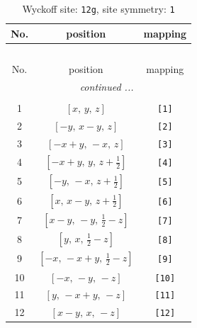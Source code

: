\documentclass[fleqn,8pt]{jsarticle}
\begin{document}
\renewcommand{\arraystretch}{1.2}
\begin{longtable}{ccc}
\caption{Wyckoff site: {\tt 12g}, site symmetry: {\tt 1}}
 \\
 \hline \hline
No. & position & mapping \\ \hline \endfirsthead

\multicolumn{2}{l}{\tablename\ \thetable{}} \\
 \hline \hline
No. & position & mapping \\ \hline \endhead

 \hline \hline
\multicolumn{2}{r}{\footnotesize\it continued ...} \\ \endfoot

 \hline \hline
\multicolumn{2}{r}{} \\ \endlastfoot

1 & $\left[ x,\, y,\, z \right]$ & {\tt [1]} \\ \hline
2 & $\left[ - y,\, x - y,\, z \right]$ & {\tt [2]} \\ \hline
3 & $\left[ - x + y,\, - x,\, z \right]$ & {\tt [3]} \\ \hline
4 & $\left[ - x + y,\, y,\, z + \frac{1}{2} \right]$ & {\tt [4]} \\ \hline
5 & $\left[ - y,\, - x,\, z + \frac{1}{2} \right]$ & {\tt [5]} \\ \hline
6 & $\left[ x,\, x - y,\, z + \frac{1}{2} \right]$ & {\tt [6]} \\ \hline
7 & $\left[ x - y,\, - y,\, \frac{1}{2} - z \right]$ & {\tt [7]} \\ \hline
8 & $\left[ y,\, x,\, \frac{1}{2} - z \right]$ & {\tt [8]} \\ \hline
9 & $\left[ - x,\, - x + y,\, \frac{1}{2} - z \right]$ & {\tt [9]} \\ \hline
10 & $\left[ - x,\, - y,\, - z \right]$ & {\tt [10]} \\ \hline
11 & $\left[ y,\, - x + y,\, - z \right]$ & {\tt [11]} \\ \hline
12 & $\left[ x - y,\, x,\, - z \right]$ & {\tt [12]} \\
\end{longtable}
\end{document}
